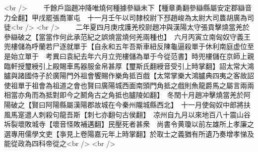 <br />
　　千餘戶詣趙冲降唯燒何種據參䜌未下【種章勇翻參䜌縣屬安定郡䜌音力全翻】甲戌罷張喬軍屯　十一月壬午以司隸校尉下邳趙峻為太尉大司農胡廣為司徒<br />
<br />
　　二年夏四月庚戌護羌校尉趙冲與漢陽太守張貢擊燒當羌於參䜌破之【當當作何此承范紀之誤燒當燒何羌兩種也】　六月丙寅立南匈奴守義王兜樓儲為呼蘭若尸逐就單于【自永和五年吾斯車紐反陳龜逼殺單于休利南庭虚位至是始立單于　考異曰袁紀去年六月立兜樓儲為單于今從范書】時兜樓儲在京師上親臨軒授璽綬引上殿賜車馬器服金帛甚厚【璽斯氏翻綬音受引上時掌翻】詔太常大鴻臚與諸國侍子於廣陽門外祖會饗賜作樂角抵百戲【太常掌樂大鴻臚典四夷之客故詔使祖單于祖會為祖道之會也賢曰廣陽城西面南頭門角抵之戲則魚龍爵馬之屬言兩兩相當亦角而為抵對即今之鬭角古之角抵也臚陵如翻】　冬閏十月趙冲擊燒當羌於阿陽破之【賢曰阿陽縣屬漢陽郡故城在今秦州隴城縣西北】　十一月使匈奴中郎將扶風馬寔遣人刺殺句龍吾斯【刺七亦翻句古侯翻】　凉州自九月以來地百八十震山谷坼裂壞敗城寺【壞音怪敗補邁翻】民壓死者甚衆　尚書令黄瓊以前左雄所上孝廉之選專用儒學文吏【亊見上卷陽嘉元年上時掌翻】於取士之義猶有所遺乃奏增孝悌及能從政為四科帝從之<br />
<br />
